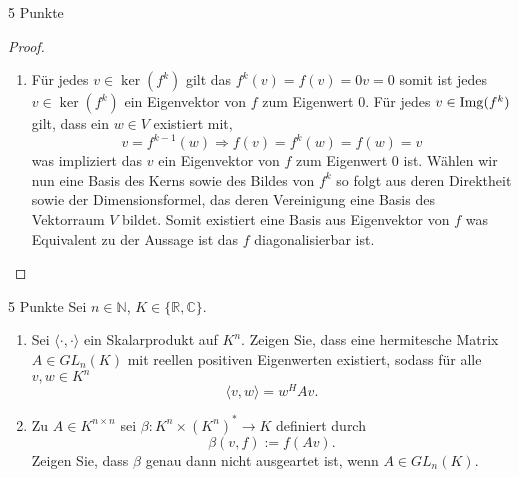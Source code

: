 \documentclass{problemset}
\begin{document}
\begin{problem}{5 Punkte}
\begin{proof}
\begin{enumerate}
        \item Für jedes \(v \in \ker(f^k)\) gilt das \(f^k(v) = f(v) = 0 v =
              0\) somit ist jedes \(v \in \ker(f^k)\) ein Eigenvektor von \(f\)
              zum Eigenwert \(0\). Für jedes \(v \in \operatorname{Img}(f^k)\) gilt, dass ein
              \(w \in V\) existiert mit,
              \begin{equation*}
                  v = f^{k-1}(w) \Rightarrow f(v) = f^k(w) = f(w) = v
              \end{equation*}
              was impliziert das \(v\) ein Eigenvektor von \(f\) zum Eigenwert \(0\) ist.
              Wählen wir nun eine Basis des Kerns sowie des Bildes von \(f^k\) so folgt aus
              deren Direktheit sowie der Dimensionsformel, das deren Vereinigung eine Basis
              des Vektorraum \(V\) bildet. Somit existiert eine Basis aus Eigenvektor von
              \(f\) was Equivalent zu der Aussage ist das \(f\) diagonalisierbar ist.
    \end{enumerate}
\end{proof}

\end{problem}

\begin{problem}{5 Punkte}
Sei $n \in \mathbb{N}$, $K \in \{\mathbb{R}, \mathbb{C}\}$.
\begin{enumerate}
    \item Sei $\langle \cdot , \cdot \rangle$ ein Skalarprodukt auf $K^n$.
          Zeigen Sie, dass eine hermitesche Matrix $A \in GL_n(K)$ mit reellen
          positiven Eigenwerten existiert, sodass für alle $v, w \in K^n$
          \[
              \langle v, w \rangle = w^H A v.
          \]
    \item Zu $A \in K^{n \times n}$ sei $\beta : K^n \times (K^n)^* \to K$
          definiert durch
          \[
              \beta(v, f) := f(Av).
          \]
          Zeigen Sie, dass $\beta$ genau dann nicht ausgeartet ist, wenn $A \in
          GL_n(K)$.
\end{enumerate}
\end{problem}
\end{document}
